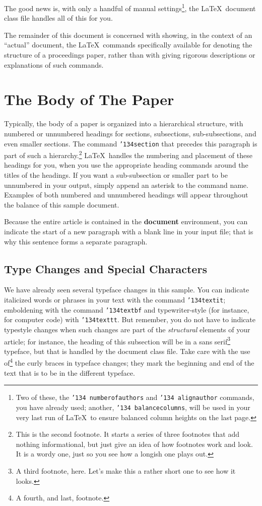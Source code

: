 \documentclass{sig-alternate-05-2015}
\begin{document}
The good news is, with only a handful of manual
settings\footnote{Two of these, the {\texttt{\char'134 numberofauthors}}
and {\texttt{\char'134 alignauthor}} commands, you have
already used; another, {\texttt{\char'134 balancecolumns}}, will
be used in your very last run of \LaTeX\ to ensure
balanced column heights on the last page.}, the \LaTeX\ document
class file handles all of this for you.

The remainder of this document is concerned with showing, in
the context of an ``actual'' document, the \LaTeX\ commands
specifically available for denoting the structure of a
proceedings paper, rather than with giving rigorous descriptions
or explanations of such commands.

\section{The {\secit Body} of The Paper}
Typically, the body of a paper is organized
into a hierarchical structure, with numbered or unnumbered
headings for sections, subsections, sub-subsections, and even
smaller sections.  The command \texttt{{\char'134}section} that
precedes this paragraph is part of such a
hierarchy.\footnote{This is the second footnote.  It
starts a series of three footnotes that add nothing
informational, but just give an idea of how footnotes work
and look. It is a wordy one, just so you see
how a longish one plays out.} \LaTeX\ handles the numbering
and placement of these headings for you, when you use
the appropriate heading commands around the titles
of the headings.  If you want a sub-subsection or
smaller part to be unnumbered in your output, simply append an
asterisk to the command name.  Examples of both
numbered and unnumbered headings will appear throughout the
balance of this sample document.

Because the entire article is contained in
the \textbf{document} environment, you can indicate the
start of a new paragraph with a blank line in your
input file; that is why this sentence forms a separate paragraph.

\subsection{Type Changes and {\subsecit Special} Characters}
We have already seen several typeface changes in this sample.  You
can indicate italicized words or phrases in your text with
the command \texttt{{\char'134}textit}; emboldening with the
command \texttt{{\char'134}textbf}
and typewriter-style (for instance, for computer code) with
\texttt{{\char'134}texttt}.  But remember, you do not
have to indicate typestyle changes when such changes are
part of the \textit{structural} elements of your
article; for instance, the heading of this subsection will
be in a sans serif\footnote{A third footnote, here.
Let's make this a rather short one to
see how it looks.} typeface, but that is handled by the
document class file. Take care with the use
of\footnote{A fourth, and last, footnote.}
the curly braces in typeface changes; they mark
the beginning and end of
the text that is to be in the different typeface.
\end{document}
